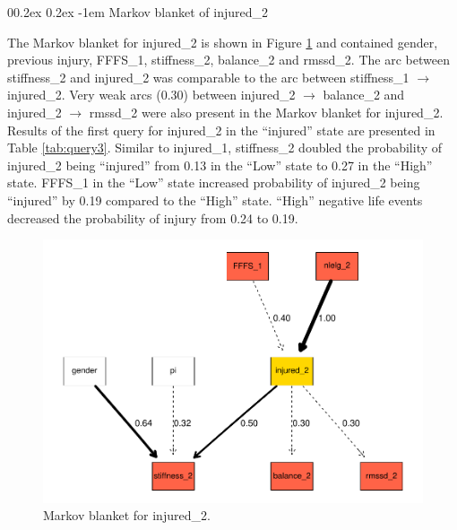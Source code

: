 \documentclass[
  english,
  man,floatsintext]{apa6}
\makeatletter
\renewcommand{\paragraph}{\@startsection{paragraph}{4}{\parindent}%
  {0\baselineskip \@plus 0.2ex \@minus 0.2ex}%
  {-1em}%
  {\normalfont\normalsize\bfseries\itshape\typesectitle}}
\makeatother
\begin{document}
\hypertarget{markov-blanket-of-injured_2}{%
\paragraph{Markov blanket of injured\_2}\label{markov-blanket-of-injured_2}}

The Markov blanket for injured\_2 is shown in Figure \ref{fig:mb2} and contained gender, previous injury, FFFS\_1, stiffness\_2, balance\_2 and rmssd\_2.
The arc between stiffness\_2 and injured\_2 was comparable to the arc between stiffness\_1 \(\rightarrow\) injured\_2.
Very weak arcs (0.30) between injured\_2 \(\rightarrow\) balance\_2 and injured\_2 \(\rightarrow\) rmssd\_2 were also present in the Markov blanket for injured\_2.
Results of the first query for injured\_2 in the \enquote{injured} state are presented in Table \ref{tab:query3}.
Similar to injured\_1, stiffness\_2 doubled the probability of injured\_2 being \enquote{injured} from 0.13 in the \enquote{Low} state to 0.27 in the \enquote{High} state.
FFFS\_1 in the \enquote{Low} state increased probability of injured\_2 being \enquote{injured} by 0.19 compared to the \enquote{High} state.
\enquote{High} negative life events decreased the probability of injury from 0.24 to 0.19.

\begin{figure}[H]
\centering
\includegraphics{figs/study1figs/mb2-1.pdf}
\caption{\label{fig:mb2}Markov blanket for injured\_2.}
\end{figure}
\end{document}
